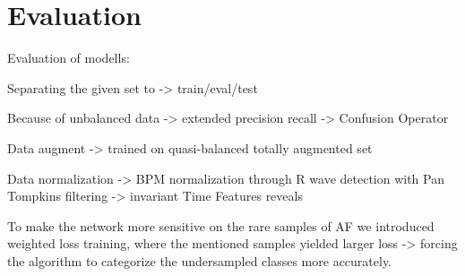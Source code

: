 \chapter{Evaluation}

Evaluation of modells:

Separating the given set to -> train/eval/test

Because of unbalanced data -> extended precision recall -> Confusion Operator

Data augment -> trained on quasi-balanced totally augmented set

Data normalization -> BPM normalization through R wave detection with Pan Tompkins filtering -> invariant Time Features reveals

To make the network more sensitive on the rare samples of AF we introduced weighted loss training, where the mentioned samples yielded larger loss -> forcing the algorithm to categorize the undersampled classes more accurately.
